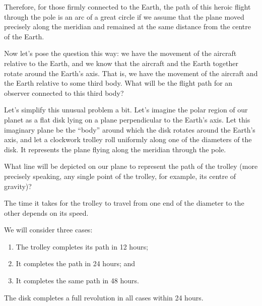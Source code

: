 Therefore, for those firmly connected to the Earth, the path of this heroic flight through the pole is an arc of a great circle if we assume that the plane moved precisely along the meridian and remained at the same distance from the centre of the Earth.

Now let's pose the question this way: we have the movement of the aircraft relative to the Earth, and we know that the aircraft and the Earth together rotate around the Earth's axis. That is, we have the movement of the aircraft and the Earth relative to some third body. What will be the flight path for an observer connected to this third body?

Let's simplify this unusual problem a bit. Let's imagine the polar region of our planet as a flat disk lying on a plane perpendicular to the Earth's axis. Let this imaginary plane be the ``body'' around which the disk rotates around the Earth's axis, and let a clockwork trolley roll uniformly along one of the diameters of the disk. It represents the plane flying along the meridian through the pole.

What line will be depicted on our plane to represent the path of the trolley (more precisely speaking, any single point of the trolley, for example, its centre of gravity)?

The time it takes for the trolley to travel from one end of the diameter to the other depends on its speed.

We will consider three cases:
\begin{enumerate}
\item The trolley completes its path in 12 hours;
\item It completes the path in 24 hours; and
\item It completes the same path in 48 hours.
\end{enumerate}
The disk completes a full revolution in all cases within 24 hours.

